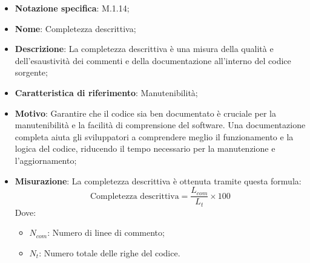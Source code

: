 \begin{itemize}
    \item \textbf{Notazione specifica}: M.1.14;
    \item \textbf{Nome}: Completezza descrittiva;
    \item \textbf{Descrizione}: La completezza descrittiva è una misura della qualità e dell'esaustività dei commenti e della documentazione all'interno del codice sorgente;
    \item \textbf{Caratteristica di riferimento}: Manutenibilità;
    \item \textbf{Motivo}: Garantire che il codice sia ben documentato è cruciale per la manutenibilità e la facilità di comprensione del software. Una documentazione completa aiuta gli sviluppatori a comprendere meglio il funzionamento e la logica del codice, riducendo il tempo necessario per la manutenzione e l'aggiornamento;
    \item \textbf{Misurazione}: La completezza descrittiva è ottenuta tramite questa formula:
    \[
    \text{Completezza descrittiva} = \frac{L_{com}}{L_{t}} \times 100
    \]
    Dove:
    \begin{itemize}
        \item $N_{com}$: Numero di linee di commento;
        \item $N_{t}$: Numero totale delle righe del codice.
    \end{itemize}
    
\end{itemize}
